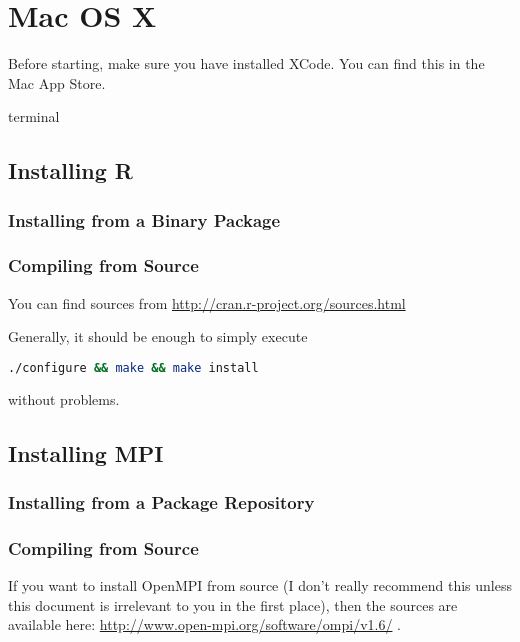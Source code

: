 \section{Mac OS X}

Before starting, make sure you have installed XCode.  You can find this in the Mac App Store.


terminal



\subsection{Installing R}

\subsubsection{Installing from a Binary Package}




\subsubsection{Compiling from Source}

You can find  sources from \url{http://cran.r-project.org/sources.html}

Generally, it should be enough to simply execute
\begin{lstlisting}[language=sh]
./configure && make && make install
\end{lstlisting}
without problems.









\subsection{Installing MPI}

\subsubsection{Installing from a Package Repository}





\subsubsection{Compiling from Source}
If you want to install OpenMPI from source (I don't really recommend this unless this document is irrelevant to you in the first place), then the sources are available here:  \url{http://www.open-mpi.org/software/ompi/v1.6/} .









